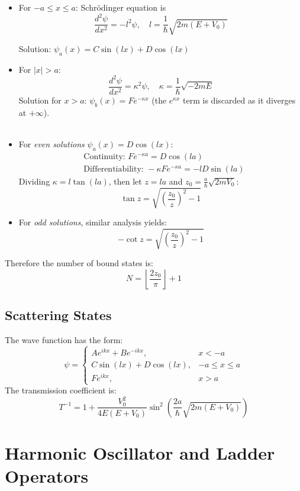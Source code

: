 \begin{itemize}

\item For $-a \leq x \leq a$: Schrödinger equation is 
\[
\frac{d^2\psi}{dx^2} = -l^2\psi, \quad
l = \frac{1}{\hbar}\sqrt{2m(E + V_0)}
\]

Solution: $\psi_a(x) = C\sin(lx) + D\cos(lx)$

\item For $|x| > a$: 
\[
\frac{d^2\psi}{dx^2} = \kappa^2\psi, \quad 
\kappa = \frac{1}{\hbar}\sqrt{-2mE}
\]
Solution for $x > a$: $\psi_b(x) = Fe^{-\kappa x}$ (the $e^{\kappa x}$ term is discarded as it diverges at $+\infty$).\\ \\
\item For \emph{even solutions} $\psi_a(x) = D\cos(lx)$:
\begin{align*}
&\text{Continuity: } Fe^{-\kappa a} = D\cos(la) \\
&\text{Differentiability: } -\kappa Fe^{-\kappa a} = -lD\sin(la)
\end{align*}
Dividing $\kappa = l\tan(la)$, then let $z = la$ and $z_0 = \frac{a}{\hbar}\sqrt{2mV_0}$:
\[
\tan z = \sqrt{\left(\frac{z_0}{z}\right)^2 - 1}
\]
\item For \emph{odd solutions}, similar analysis yields:
\[
-\cot z = \sqrt{\left(\frac{z_0}{z}\right)^2 - 1}
\]
\end{itemize}

Therefore the number of bound states is:
\[N=\left\lfloor\frac{2z_0}{\pi}\right\rfloor + 1\]

\subsection{Scattering States}

The wave function has the form:
\[
\psi = \begin{cases} Ae^{ikx} + Be^{-ikx}, & x < -a \\ C\sin(lx) + D\cos(lx), & -a \leq x \leq a \\ Fe^{ikx}, & x > a \end{cases}
\]
The transmission coefficient is:
\[
T^{-1} = 1 + \frac{V_0^2}{4E(E + V_0)}\sin^2\left(\frac{2a}{\hbar}\sqrt{2m(E + V_0)}\right)
\]

\section{Harmonic Oscillator and Ladder Operators}

